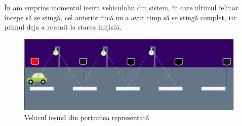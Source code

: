 În  am surprins momentul ieșirii vehiculului din sistem, în care ultimul felinar începe să se stingă, cel anterior încă nu a avut timp să se stingă complet, iar primul deja a revenit la starea inițială.

 \begin{figure}[!ht]
    \begin{center}
    \includegraphics[width=0.9\linewidth,keepaspectratio]{pics/cardraw3.jpg}
    \end{center}
    \caption{Vehicul ieșind din porțiunea reprezentată}
    \label{fig:car3}
\end{figure}
